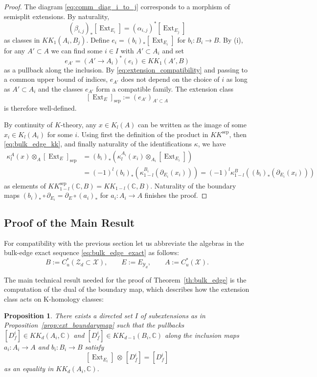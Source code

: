 \documentclass[12pt]{amsart}
\newtheorem{proposition}[theorem]{Proposition}
\newcommand{\CM}{{\mathbb C}}
\newcommand{\Xx}{{\mathcal X}}
\newcommand{\Yy}{{\mathcal Y}}
\newcommand{\Zz}{{\mathcal Z}}
\newcommand{\pdv}{\partial}
\DeclareMathOperator*{\Ext}{Ext}
\begin{document}
\begin{proof}
The diagram \eqref{eq:comm_diag_i_to_j} corresponds to a morphism of semisplit extensions. By naturality,
\begin{equation}
\label{eq:extension_compatibility}
(\beta_{i,j})_*[{\Ext}_{E_i}] =(\alpha_{i,j})^*[{\Ext}_{E_j}]
\end{equation}
as classes in $KK_1(A_i,B_j)$. Define $e_i= (b_i)_*[{\Ext}_{E_i}]$ for $b_i: B_i\to B$. By (i), for any $A'\subset A$ we can find some $i\in I$ with $A'\subset A_i$ and set $$e_{A'}= (A' \to A_i)^*(e_i) \in KK_1(A', B)$$
as a pullback along the inclusion. By  \eqref{eq:extension_compatibility} and passing to a common upper bound of indices, $e_{A'}$ does not depend on the choice of $i$ as long as $A'\subset A_i$ and the classes $e_{A'}$ form a compatible family. The extension class $$[{\Ext}_{E}]_{\mathrm{sep}}:= (e_{A'})_{A'\subset A}$$ is therefore well-defined.

By continuity of $K$-theory, any $x \in K_l(A)$ can be written as the image of some $x_i\in K_l(A_i)$ for some $i$. Using first the definition of the product in $KK^{\mathrm{sep}}$, then \eqref{eq:bulk_edge_kk}, and finally naturality of the identifications $\kappa$, we have
\begin{align*}
\kappa_l^A(x)\otimes_{A} [{\Ext}_E]_{\mathrm{sep}} &= (b_i)_*( \kappa_l^{A_{i}}(x_i)\otimes_{A_i} [{\Ext}_{E_i}])\\
&=(-1)^{l} (b_i)_*(\kappa_{1-l}^{B_i}(\pdv_{E_i}(x_i)))=(-1)^{l} \kappa_{1-l}^B((b_i)_*(\pdv_{E_i}(x_i)))
\end{align*}
as elements of $KK_{1-l}^{\mathrm{sep}}(\CM, B)=KK_{1-l}(\CM, B)$. Naturality of the boundary maps $(b_i)_*\circ \pdv_{E_i}=\pdv_E \circ (a_i)_*$ for $a_i:A_i\to A$ finishes the proof.
\end{proof}




\subsection{Proof of the Main Result}
\label{ssec:kkproduct}

For compatibility with the previous section let us abbreviate the algebras in the bulk-edge exact sequence \eqref{eq:bulk_edge_exact} as follows:
$$B := C^*_u (\Zz_d \subset \Xx), \qquad E:= E_{\Yy_d}, \qquad A := C^*_u(\Xx).$$


The main technical result needed for the proof of Theorem~\ref{th:bulk_edge} is the computation of the dual of the boundary map, which describes how the extension class acts on K-homology classes:
\begin{proposition}
\label{prop:bulkedge_kk}
There exists a directed set $I$ of subextensions as in Proposition~\ref{prop:ext_boundarymap} such that the pullbacks $[D^{i}_{f}]\in KK_{d}(A_i,\CM)$ and $[D^{i}_{\underline{f}}]\in KK_{d-1}(B_i,\CM)$ along the inclusion maps $a_i: A_i \to A$ and $b_i: B_i \to B$ satisfy
\begin{equation}
\label{eq:kk_product_ext_i}
[{\Ext}_{E_i}] \,\otimes\, [D_{\underline{f}}^{i}] =[D_{f}^{i}]
\end{equation}
as an equality in $KK_{d}(A_i, \CM).$
\end{proposition}
\end{document}
